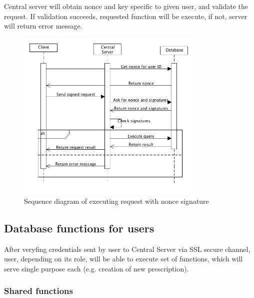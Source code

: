 Central server will obtain nonce and key specific to given user, and validate the request. If validation succeeds, requested function will be execute, if not, server will return error message.
\clearpage
\begin{figure}[h]
\centering
\includegraphics[width=0.8\textwidth]{database/nonce.png}
\caption{Sequence diagram of executing request with nonce signature}
\end{figure} 

\subsection{Database functions for users}
After veryfing credentials sent by user to Central Server via SSL secure channel, user, depending on its role, will be able to execute set of functions, which will serve single purpose each (e.g. creation of new prescription).

\subsubsection{Shared functions}

